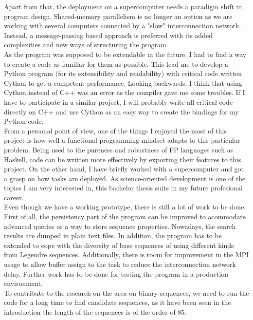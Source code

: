 \documentclass{tfg_domingo}
\begin{document}
  Apart from that, the deployment on a
  supercomputer needs a paradigm shift in program design. Shared-memory
  parallelism is no longer an option as we are working with several computers
  connected by a "slow" interconnection network. Instead, a message-passing
  based approach is preferred with its added complexities and new ways of
  structuring the program.\\

  As the program was supposed to be extendable in the future, I had to
  find a way to create a code as familiar for them as possible. This lead me to
  develop a Python program (for its extensibility and readability) with
  critical code written Cython to get a competent performance. Looking
  backwards, I think that using Cython instead of C++ was an error as the
  compiler gave me some troubles. If I have to participate in a similar project,
  I will probably write all critical code directly on C++ and use Cython as
  an easy way to create the bindings for my Python code.\\

 From a personal point of view,  one of the things I enjoyed the most of this
 project is how well a functional programming mindset adapts to this particular
 problem. Being used to the pureness and robustness of FP languages such as
 Haskell, code can be written more effectively by exporting their features to this
 project. On the other hand, I have briefly worked with a supercomputer and got a
 grasp on how tasks are deployed. As science-oriented development is one of the
 topics I am very interested in, this bachelor thesis suits in my future
 profesional career.\\

 Even though we have a working prototype, there is still a lot of work to be done.
First of all, the persistency part of the program can be improved to acommodate
advanced queries or a way to store sequence properties. Nowadays, the search
results are dumped in plain text files. In addition, the program has to be extended
to cope with the diversity of base sequences of using different kinds from Legendre
sequences. Additionally, there is room for improvement in the MPI usage to allow
buffer assign to the task  to reduce the interconnection network delay. Further
work has to be done for testing the program in a production environment.\\

To contribute to the research on the area on binary sequences, we need to run the
code for a long time to find candidate sequences, as it have been seen in the
introduction the length of the sequences is of the order of $85$.\\
\end{document}

